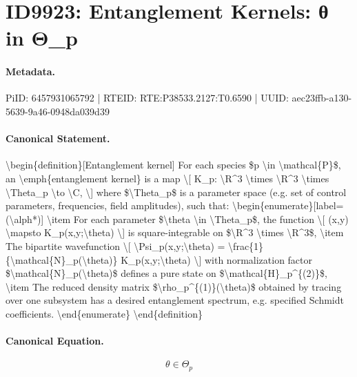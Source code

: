 \section*{ID9923: Entanglement Kernels: θ in Θ\_p}
\paragraph{Metadata.}
PiID: 6457931065792 | RTEID: RTE:P38533.2127:T0.6590 | UUID: aec23ffb-a130-5639-9a46-0948da039d39

\paragraph{Canonical Statement.}
\textbackslash{}begin\{definition\}[Entanglement kernel] For each species \$p \textbackslash{}in \textbackslash{}mathcal\{P\}\$, an \textbackslash{}emph\{entanglement kernel\} is a map \textbackslash{}[ K\_p: \textbackslash{}R\textasciicircum{}3 \textbackslash{}times \textbackslash{}R\textasciicircum{}3 \textbackslash{}times \textbackslash{}Theta\_p \textbackslash{}to \textbackslash{}C, \textbackslash{}] where \$\textbackslash{}Theta\_p\$ is a parameter space (e.g. set of control parameters, frequencies, field amplitudes), such that: \textbackslash{}begin\{enumerate\}[label=(\textbackslash{}alph*)] \textbackslash{}item For each parameter \$\textbackslash{}theta \textbackslash{}in \textbackslash{}Theta\_p\$, the function \textbackslash{}[ (x,y) \textbackslash{}mapsto K\_p(x,y;\textbackslash{}theta) \textbackslash{}] is square-integrable on \$\textbackslash{}R\textasciicircum{}3 \textbackslash{}times \textbackslash{}R\textasciicircum{}3\$, \textbackslash{}item The bipartite wavefunction \textbackslash{}[ \textbackslash{}Psi\_p(x,y;\textbackslash{}theta) = \textbackslash{}frac\{1\}\{\textbackslash{}mathcal\{N\}\_p(\textbackslash{}theta)\} K\_p(x,y;\textbackslash{}theta) \textbackslash{}] with normalization factor \$\textbackslash{}mathcal\{N\}\_p(\textbackslash{}theta)\$ defines a pure state on \$\textbackslash{}mathcal\{H\}\_p\textasciicircum{}\{(2)\}\$, \textbackslash{}item The reduced density matrix \$\textbackslash{}rho\_p\textasciicircum{}\{(1)\}(\textbackslash{}theta)\$ obtained by tracing over one subsystem has a desired entanglement spectrum, e.g. specified Schmidt coefficients. \textbackslash{}end\{enumerate\} \textbackslash{}end\{definition\}

\paragraph{Canonical Equation.}
\[
\theta \in \Theta_p
\]

